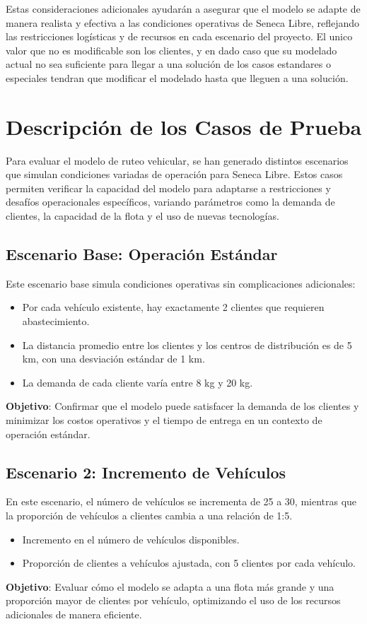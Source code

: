 \documentclass[12pt]{article}
\begin{document}
Estas consideraciones adicionales ayudarán a asegurar que el modelo se adapte de manera realista y efectiva a las condiciones operativas de Seneca Libre, reflejando las restricciones logísticas y de recursos en cada escenario del proyecto. El unico valor que no es modificable son los clientes, y en dado caso que su modelado actual no sea suficiente para llegar a una solución de los casos estandares o especiales tendran que modificar el modelado hasta que lleguen a una solución.

\newpage

\section{Descripción de los Casos de Prueba}
Para evaluar el modelo de ruteo vehicular, se han generado distintos escenarios que simulan condiciones variadas de operación para Seneca Libre. Estos casos permiten verificar la capacidad del modelo para adaptarse a restricciones y desafíos operacionales específicos, variando parámetros como la demanda de clientes, la capacidad de la flota y el uso de nuevas tecnologías.

\subsection{Escenario Base: Operación Estándar}
Este escenario base simula condiciones operativas sin complicaciones adicionales:
\begin{itemize}
    \item Por cada vehículo existente, hay exactamente 2 clientes que requieren abastecimiento.
    \item La distancia promedio entre los clientes y los centros de distribución es de 5 km, con una desviación estándar de 1 km.
    \item La demanda de cada cliente varía entre 8 kg y 20 kg.
\end{itemize}
\textbf{Objetivo}: Confirmar que el modelo puede satisfacer la demanda de los clientes y minimizar los costos operativos y el tiempo de entrega en un contexto de operación estándar.

\subsection{Escenario 2: Incremento de Vehículos}
En este escenario, el número de vehículos se incrementa de 25 a 30, mientras que la proporción de vehículos a clientes cambia a una relación de 1:5.
\begin{itemize}
    \item Incremento en el número de vehículos disponibles.
    \item Proporción de clientes a vehículos ajustada, con 5 clientes por cada vehículo.
\end{itemize}
\textbf{Objetivo}: Evaluar cómo el modelo se adapta a una flota más grande y una proporción mayor de clientes por vehículo, optimizando el uso de los recursos adicionales de manera eficiente.
\end{document}
